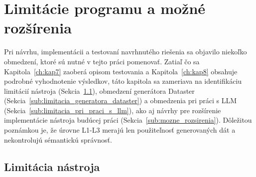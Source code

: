 
\chapter{Limitácie programu a možné rozšírenia}
\label{ch:kap9}

Pri návrhu, implementácii a testovaní navrhnutého riešenia sa objavilo niekoľko obmedzení, ktoré sú nutné v tejto práci pomenovať. Zatiaľ čo sa Kapitola~\ref{ch:kap7} zaoberá opisom testovania a Kapitola~\ref{ch:kap8} obsahuje podrobné vyhodnotenie výsledkov, táto kapitola sa zameriava na identifikáciu limitácií nástroja (Sekcia~\ref{sub:limitacia_nastroja}), obmedzení generátora Dataster (Sekcia~\ref{sub:limitacia_generatora_dataster}) a obmedzenia pri práci s LLM (Sekcia~\ref{sub:limitacia_pri_praci_s_llm}), ako aj návrhy pre rozšírenie implementácie nástroja budúcej práci (Sekcia~\ref{sub:mozne_rozsirenia}). Dôležitou poznámkou je, že úrovne L1-L3 merajú len použiteľnosť generovaných dát a nekontrolujú sémantickú správnosť.

\section{Limitácia nástroja}
\label{sub:limitacia_nastroja}



